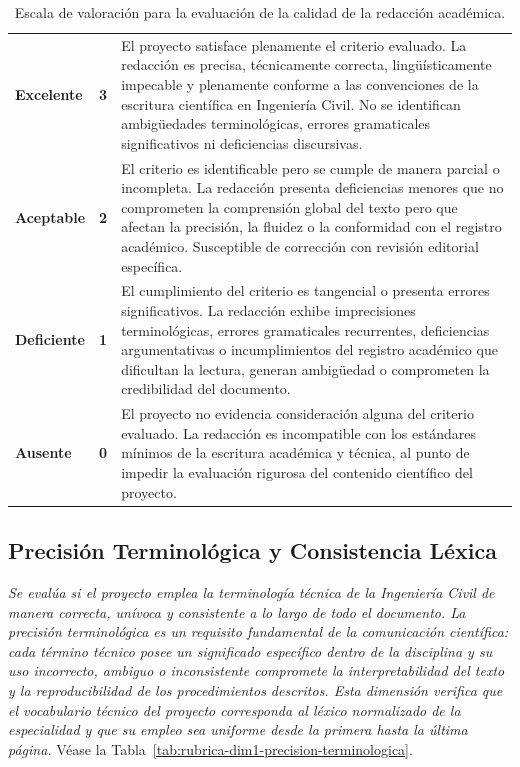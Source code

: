 \vspace{-10pt}
\begin{table}[htbp]
\centering
\scriptsize
\caption{Escala de valoración para la evaluación de la calidad de la redacción académica.}
\label{tab:escala-redaccion-academica}
\begin{tabularx}{\textwidth}{|C{1.8cm}|C{.6cm}|X|}
\hline
{}
 &  &  \\ \hline
\textcolor{csuf}{\textbf{Excelente}} & \textbf{3} & El proyecto satisface plenamente el criterio evaluado. La redacción es precisa, técnicamente correcta, lingüísticamente impecable y plenamente conforme a las convenciones de la escritura científica en Ingeniería Civil. No se identifican ambigüedades terminológicas, errores gramaticales significativos ni deficiencias discursivas. \\ \hline
{}
\textcolor{cace}{\textbf{Aceptable}} & \textbf{2} & El criterio es identificable pero se cumple de manera parcial o incompleta. La redacción presenta deficiencias menores que no comprometen la comprensión global del texto pero que afectan la precisión, la fluidez o la conformidad con el registro académico. Susceptible de corrección con revisión editorial específica. \\ \hline
\textcolor{cdef}{\textbf{Deficiente}} & \textbf{1} & El cumplimiento del criterio es tangencial o presenta errores significativos. La redacción exhibe imprecisiones terminológicas, errores gramaticales recurrentes, deficiencias argumentativas o incumplimientos del registro académico que dificultan la lectura, generan ambigüedad o comprometen la credibilidad del documento. \\ \hline
{}
\textcolor{cins}{\textbf{Ausente}} & \textbf{0} & El proyecto no evidencia consideración alguna del criterio evaluado. La redacción es incompatible con los estándares mínimos de la escritura académica y técnica, al punto de impedir la evaluación rigurosa del contenido científico del proyecto. \\ \hline
\end{tabularx}
\end{table}

\clearpage
\subsection{Precisión Terminológica y Consistencia Léxica}

\textit{Se evalúa si el proyecto emplea la terminología técnica de la Ingeniería Civil de manera correcta, unívoca y consistente a lo largo de todo el documento. La precisión terminológica es un requisito fundamental de la comunicación científica: cada término técnico posee un significado específico dentro de la disciplina y su uso incorrecto, ambiguo o inconsistente compromete la interpretabilidad del texto y la reproducibilidad de los procedimientos descritos. Esta dimensión verifica que el vocabulario técnico del proyecto corresponda al léxico normalizado de la especialidad y que su empleo sea uniforme desde la primera hasta la última página.} Véase la Tabla~\ref{tab:rubrica-dim1-precision-terminologica}.

